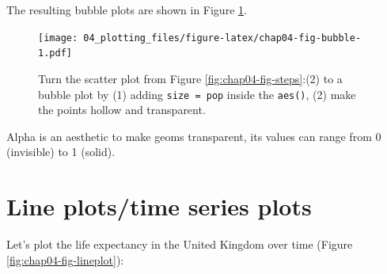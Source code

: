 \documentclass[
  12pt,
  krantz2]{krantz}
\makeatletter
\newenvironment{Shaded}{\begin{snugshade}}{\end{snugshade}}
\newcommand{\DataTypeTok}[1]{\textcolor[rgb]{0.13,0.29,0.53}{#1}}
\newcommand{\DecValTok}[1]{\textcolor[rgb]{0.00,0.00,0.81}{#1}}
\newcommand{\FloatTok}[1]{\textcolor[rgb]{0.00,0.00,0.81}{#1}}
\newcommand{\KeywordTok}[1]{\textcolor[rgb]{0.13,0.29,0.53}{\textbf{#1}}}
\newcommand{\NormalTok}[1]{#1}
\newcommand{\OperatorTok}[1]{\textcolor[rgb]{0.81,0.36,0.00}{\textbf{#1}}}
\newcommand{\StringTok}[1]{\textcolor[rgb]{0.31,0.60,0.02}{#1}}
\newenvironment{kframe}{%
\medskip{}
\setlength{\fboxsep}{.8em}
 \def\at@end@of@kframe{}%
 \ifinner\ifhmode%
  \def\at@end@of@kframe{\end{minipage}}%
  \begin{minipage}{\columnwidth}%
 \fi\fi%
 \def\FrameCommand##1{\hskip\@totalleftmargin \hskip-\fboxsep
 \colorbox{shadecolor}{##1}\hskip-\fboxsep
     \hskip-\linewidth \hskip-\@totalleftmargin \hskip\columnwidth}%
 \MakeFramed {\advance\hsize-\width
   \@totalleftmargin\z@ \linewidth\hsize
   \@setminipage}}%
 {\par\unskip\endMakeFramed%
 \at@end@of@kframe}
\renewenvironment{Shaded}{\begin{kframe}}{\end{kframe}}
\makeatother
\begin{document}
\begin{Shaded}
\end{Shaded}

The resulting bubble plots are shown in Figure \ref{fig:chap04-fig-bubble}.

\begin{figure}
\centering
\texttt{[image: 04\_plotting\_files/figure-latex/chap04-fig-bubble-1.pdf]}
\caption{\label{fig:chap04-fig-bubble}Turn the scatter plot from Figure \ref{fig:chap04-fig-steps}:(2) to a bubble plot by (1) adding \texttt{size\ =\ pop} inside the \texttt{aes()}, (2) make the points hollow and transparent.}
\end{figure}

Alpha is an aesthetic to make geoms transparent, its values can range from 0 (invisible) to 1 (solid).

\hypertarget{line-plotstime-series-plots}{%
\section{Line plots/time series plots}\label{line-plotstime-series-plots}}


Let's plot the life expectancy in the United Kingdom over time (Figure \ref{fig:chap04-fig-lineplot}):

\begin{Shaded}
\end{Shaded}
\end{document}
